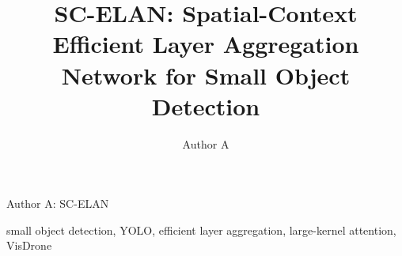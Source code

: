 \documentclass[lettersize,journal]{IEEEtran}
\begin{document}
\title{SC-ELAN: Spatial-Context Efficient Layer Aggregation Network for Small Object Detection}
\author{Author A}

%
{Author A: SC-ELAN}

\maketitle



\begin{IEEEkeywords}
small object detection, YOLO, efficient layer aggregation, large-kernel attention, VisDrone
\end{IEEEkeywords}







\end{document}
